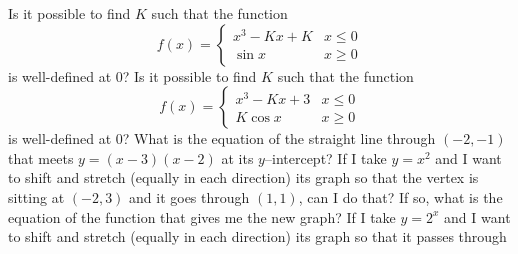 \begin{questions}
  \question Is it possible to find $ K $ such that the function
            \begin{displaymath}
              f(x) = \begin{cases}
                      x^3 - Kx + K & x \leq 0\\
                      \sin x & x \geq 0
                    \end{cases}
            \end{displaymath}
            is well-defined at 0?
  \question Is it possible to find $ K $ such that the function
            \begin{displaymath}
              f(x) = \begin{cases}
                      x^3 - Kx + 3 & x \leq 0\\
                      K\cos x & x \geq 0
                    \end{cases}
            \end{displaymath}
            is well-defined at 0?
  \question What is the equation of the straight line through $ (-2,-1) $ that meets $ y = (x - 3)(x - 2) $ at its $ y$--intercept?
  \question If I take $ y = x^2 $ and I want to shift and stretch (equally in each direction) its graph so that the vertex is sitting
            at $ (-2, 3) $ and it goes through $ (1,1) $, can I do that? If so, what is the equation of the function that gives me the new graph?
  \question If I take $ y = 2^x $ and I want to shift and stretch (equally in each direction) its graph so that it passes through

\end{questions}
